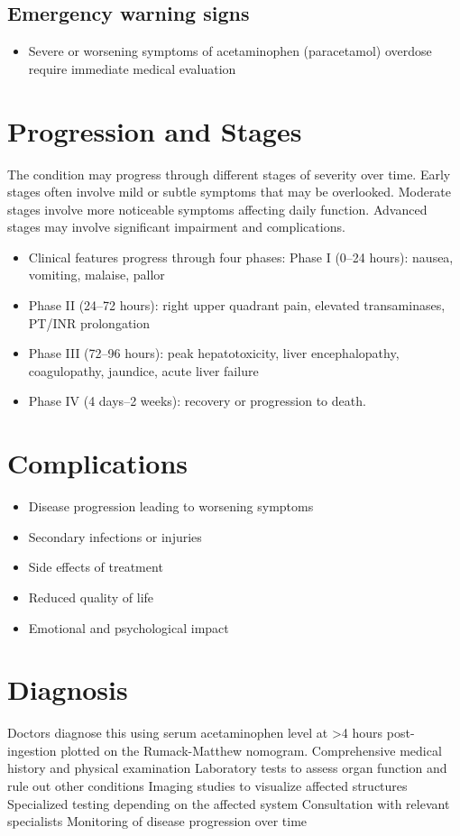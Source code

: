 \subsection{Emergency warning signs}
\begin{itemize}[noitemsep]
  \item Severe or worsening symptoms of acetaminophen (paracetamol) overdose require immediate medical evaluation
\end{itemize}
\section{Progression and Stages}
The condition may progress through different stages of severity over time. Early stages often involve mild or subtle symptoms that may be overlooked. Moderate stages involve more noticeable symptoms affecting daily function. Advanced stages may involve significant impairment and complications.

\begin{itemize}[noitemsep]
  \item Clinical features progress through four phases: Phase I (0--24 hours): nausea, vomiting, malaise, pallor
  \item Phase II (24--72 hours): right upper quadrant pain, elevated transaminases, PT/INR prolongation
  \item Phase III (72--96 hours): peak hepatotoxicity, liver encephalopathy, coagulopathy, jaundice, acute liver failure
  \item Phase IV (4 days--2 weeks): recovery or progression to death.
\end{itemize}
\section{Complications}
\begin{itemize}[noitemsep]
  \item Disease progression leading to worsening symptoms
  \item Secondary infections or injuries
  \item Side effects of treatment
  \item Reduced quality of life
  \item Emotional and psychological impact
\end{itemize}
\section{Diagnosis}
Doctors diagnose this using serum acetaminophen level at >4 hours post-ingestion plotted on the Rumack-Matthew nomogram. Comprehensive medical history and physical examination Laboratory tests to assess organ function and rule out other conditions Imaging studies to visualize affected structures Specialized testing depending on the affected system Consultation with relevant specialists Monitoring of disease progression over time

